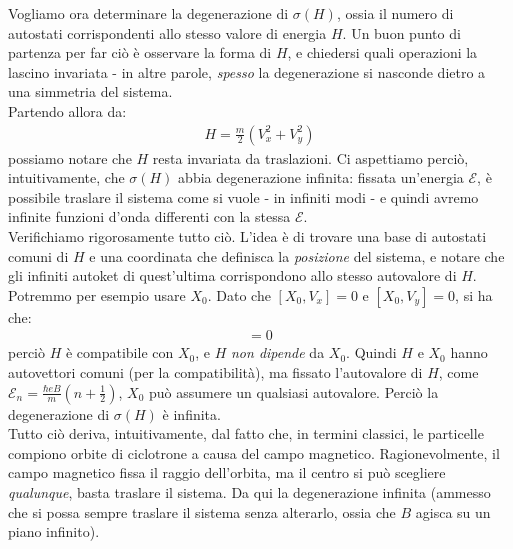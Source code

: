 \documentclass[../../FisicaTeorica.tex]{subfiles}
\begin{document}
\begin{enumerate}
Vogliamo ora determinare la degenerazione di $\sigma(H)$, ossia il numero di autostati corrispondenti allo stesso valore di energia $H$. Un buon punto di partenza per far ciò è osservare la forma di $H$, e chiedersi quali operazioni la lascino invariata - in altre parole, \textit{spesso} la degenerazione si nasconde dietro a una simmetria del sistema.\\
Partendo allora da:
\begin{align*}
H = \frac{m}{2} \left(V_x^2 + V_y^2\right)
\end{align*}
possiamo notare che $H$ resta invariata da traslazioni. Ci aspettiamo perciò, intuitivamente, che $\sigma(H)$ abbia degenerazione infinita: fissata un'energia $\mathcal{E}$, è possibile traslare il sistema come si vuole - in infiniti modi - e quindi avremo infinite funzioni d'onda differenti con la stessa $\mathcal{E}$.\\
Verifichiamo rigorosamente tutto ciò. L'idea è di trovare una base di autostati comuni di $H$ e una coordinata che definisca la \textit{posizione} del sistema, e notare che gli infiniti autoket di quest'ultima corrispondono allo stesso autovalore di $H$. Potremmo per esempio usare $X_0$. Dato che $[X_0, V_x]=0$ e $[X_0, V_y]=0$, si ha che:
\begin{align*}
[H, X_0] = 0
\end{align*}
perciò $H$ è compatibile con $X_0$, e $H$ \textit{non dipende} da $X_0$. Quindi $H$ e $X_0$ hanno autovettori comuni (per la compatibilità), ma fissato l'autovalore di $H$, come $\mathcal{E}_n = \frac{\hbar eB}{m}\left(n+\frac{1}{2}\right)$, $X_0$ può assumere un qualsiasi autovalore. Perciò la degenerazione di $\sigma(H)$ è infinita.\\

Tutto ciò deriva, intuitivamente, dal fatto che, in termini classici, le particelle compiono orbite di ciclotrone a causa del campo magnetico. Ragionevolmente, il campo magnetico fissa il raggio dell'orbita, ma il centro si può scegliere \textit{qualunque}, basta traslare il sistema. Da qui la degenerazione infinita (ammesso che si possa sempre traslare il sistema senza alterarlo, ossia che $B$ agisca su un piano infinito).


\end{enumerate}
\end{document}
